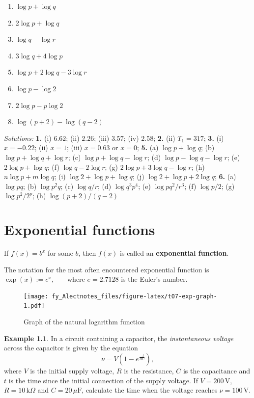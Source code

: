 \documentclass[
  12pt,
  oneside]{book}
\providecommand{\tightlist}{%
  \setlength{\itemsep}{0pt}\setlength{\parskip}{0pt}}
\theoremstyle{definition}
\theoremstyle{definition}
\newtheorem{example}{Example}[chapter]
\theoremstyle{definition}
\theoremstyle{definition}
\theoremstyle{remark}
\begin{document}
\begin{enumerate}
  \begin{enumerate}
  \def\labelenumii{\alph{enumii})}
  \tightlist
  \item
    \(\log p+\log q\)
  \item
    \(2\log p+\log q\)
  \item
    \(\log q-\log r\)
  \item
    \(3\log q+4\log p\)
  \item
    \(\log p+2\log q-3\log r\)
  \item
    \(\log p-\log 2\)
  \item
    \(2\log p-p\log 2\)
  \item
    \(\log(p+2)-\log(q-2)\)
  \end{enumerate}
\end{enumerate}

\emph{Solutions:}
\textbf{1.} (i) \(6.62\); (ii) \(2.26\); (iii) \(3.57\); (iv) \(2.58\);
\textbf{2.} (ii) \(T_1=317\);
\textbf{3.} (i) \(x=-0.22\); (ii) \(x=1\); (iii) \(x=0.63\) or \(x=0\);
\textbf{5.} (a) \(\log p+\log q\); (b) \(\log p+\log q+\log r\); (c) \(\log p+\log q-\log r\); (d) \(\log p-\log q-\log r\); (e) \(2\log p+\log q\); (f) \(\log q-2\log r\); (g) \(2\log p+3\log q-\log r\); (h) \(n\log p+m\log q\); (i) \(\log 2+\log p+\log q\); (j) \(\log 2+\log p+2\log q\);
\textbf{6.} (a) \(\log pq\); (b) \(\log p^2q\); (c) \(\log q/r\); (d) \(\log q^3p^4\); (e) \(\log pq^2/r^3\); (f) \(\log p/2\); (g) \(\log p^2/2^p\); (h) \(\log (p+2)/(q-2)\)

\chapter{Exponential functions}\label{exponential-functions}

If \(f(x)=b^x\) for some \(b\), then \(f(x)\) is called an \textbf{exponential function}.

The notation for the most often encountered exponential function is \(\exp(x):= e^x\), ~ ~ where \(e=2.7128\) is the Euler's number.

\begin{figure}
\centering
\texttt{[image: fy\_Alectnotes\_files/figure-latex/t07-exp-graph-1.pdf]}
\caption{\label{fig:t07-exp-graph}Graph of the natural logarithm function}
\end{figure}

\begin{example}
In a circuit containing a capacitor, the \emph{instantaneous voltage} across the capacitor is given by the equation
\[\nu = V\left(1-e^{\frac{-t}{RC}}\right),\]
where \(V\) is the initial supply voltage, \(R\) is the resistance, \(C\) is the capacitance and \(t\) is the time since the initial connection of the supply voltage. If \(V=200\,\mathrm{V}\), \(R=10\,\mathrm{k}\Omega\) and \(C=20\,\mu\mathrm{F}\), calculate the time when the voltage reaches \(\nu =100\,\mathrm{V}\).
\end{example}
\end{document}
